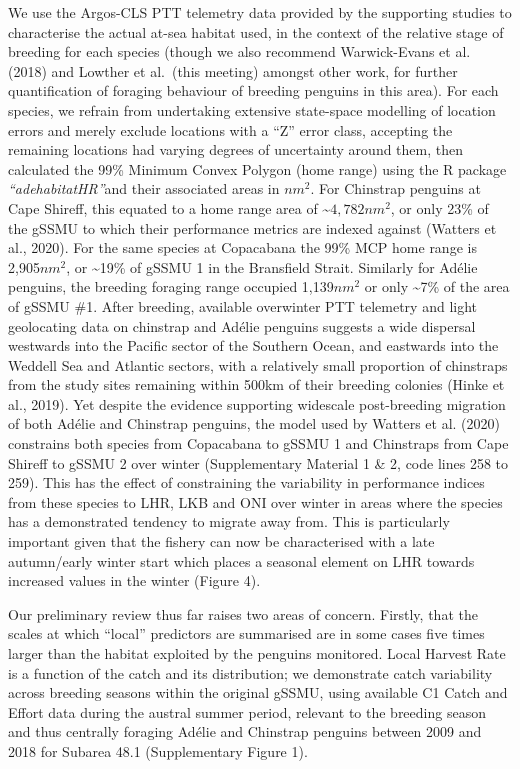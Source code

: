 \documentclass[]{elsarticle} %
\begin{document}
We use the Argos-CLS PTT telemetry data provided by the supporting
studies to characterise the actual at-sea habitat used, in the context
of the relative stage of breeding for each species (though we also
recommend Warwick-Evans et al. (2018) and Lowther et al.~(this meeting)
amongst other work, for further quantification of foraging behaviour of
breeding penguins in this area). For each species, we refrain from
undertaking extensive state-space modelling of location errors and
merely exclude locations with a ``Z'' error class, accepting the
remaining locations had varying degrees of uncertainty around them, then
calculated the 99\% Minimum Convex Polygon (home range) using the R
package \emph{``adehabitatHR''}and their associated areas in \(nm^2\).
For Chinstrap penguins at Cape Shireff, this equated to a home range
area of \textasciitilde{}\(4,782nm^2\), or only 23\% of the gSSMU to
which their performance metrics are indexed against (Watters et al.,
2020). For the same species at Copacabana the 99\% MCP home range is
2,905\(nm^2\), or \textasciitilde19\% of gSSMU 1 in the Bransfield
Strait. Similarly for Adélie penguins, the breeding foraging range
occupied 1,139\(nm^2\) or only \textasciitilde7\% of the area of gSSMU
\#1. After breeding, available overwinter PTT telemetry and light
geolocating data on chinstrap and Adélie penguins suggests a wide
dispersal westwards into the Pacific sector of the Southern Ocean, and
eastwards into the Weddell Sea and Atlantic sectors, with a relatively
small proportion of chinstraps from the study sites remaining within
500km of their breeding colonies (Hinke et al., 2019). Yet despite the
evidence supporting widescale post-breeding migration of both Adélie and
Chinstrap penguins, the model used by Watters et al. (2020) constrains
both species from Copacabana to gSSMU 1 and Chinstraps from Cape Shireff
to gSSMU 2 over winter (Supplementary Material 1 \& 2, code lines 258 to
259). This has the effect of constraining the variability in performance
indices from these species to LHR, LKB and ONI over winter in areas
where the species has a demonstrated tendency to migrate away from. This
is particularly important given that the fishery can now be
characterised with a late autumn/early winter start which places a
seasonal element on LHR towards increased values in the winter (Figure
4).

Our preliminary review thus far raises two areas of concern. Firstly,
that the scales at which ``local'' predictors are summarised are in some
cases five times larger than the habitat exploited by the penguins
monitored. Local Harvest Rate is a function of the catch and its
distribution; we demonstrate catch variability across breeding seasons
within the original gSSMU, using available C1 Catch and Effort data
during the austral summer period, relevant to the breeding season and
thus centrally foraging Adélie and Chinstrap penguins between 2009 and
2018 for Subarea 48.1 (Supplementary Figure 1).
\end{document}
